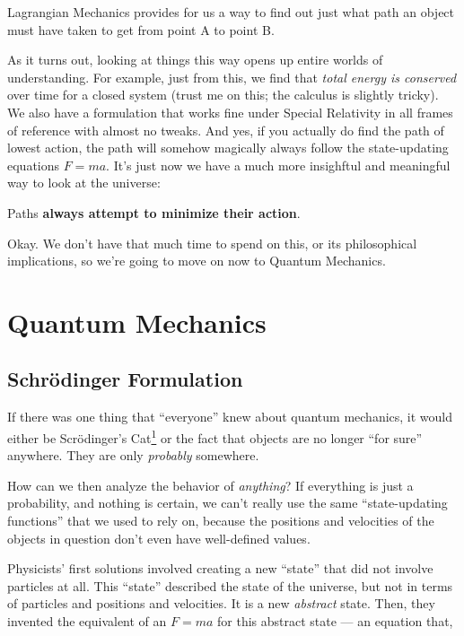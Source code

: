 \documentclass[]{article}
\renewcommand{\href}[2]{#2\footnote{\url{#1}}}
\begin{document}
Lagrangian Mechanics provides for us a way to find out just what path an
object must have taken to get from point A to point B.

As it turns out, looking at things this way opens up entire worlds of
understanding. For example, just from this, we find that \emph{total
energy is conserved} over time for a closed system (trust me on this;
the calculus is slightly tricky). We also have a formulation that works
fine under Special Relativity in all frames of reference with almost no
tweaks. And yes, if you actually do find the path of lowest action, the
path will somehow magically always follow the state-updating equations
\(F = m a\). It's just now we have a much more insighftul and meaningful
way to look at the universe:

Paths \textbf{always attempt to minimize their action}.

Okay. We don't have that much time to spend on this, or its
philosophical implications, so we're going to move on now to Quantum
Mechanics.

\section{Quantum Mechanics}\label{quantum-mechanics}

\subsection{Schrödinger Formulation}\label{schruxf6dinger-formulation}

If there was one thing that ``everyone'' knew about quantum mechanics,
it would either be
\href{http://en.wikipedia.org/wiki/Schr\%C3\%B6dinger's_cat}{Scrödinger's
Cat} or the fact that objects are no longer ``for sure'' anywhere. They
are only \emph{probably} somewhere.

How can we then analyze the behavior of \emph{anything}? If everything
is just a probability, and nothing is certain, we can't really use the
same ``state-updating functions'' that we used to rely on, because the
positions and velocities of the objects in question don't even have
well-defined values.

Physicists' first solutions involved creating a new ``state'' that did
not involve particles at all. This ``state'' described the state of the
universe, but not in terms of particles and positions and velocities. It
is a new \emph{abstract} state. Then, they invented the equivalent of an
\(F = m a\) for this abstract state --- an equation that, for every
abstract state at time \(t_0\), gives you the abstract state at time
\(t_0 + \Delta t\).
\end{document}

